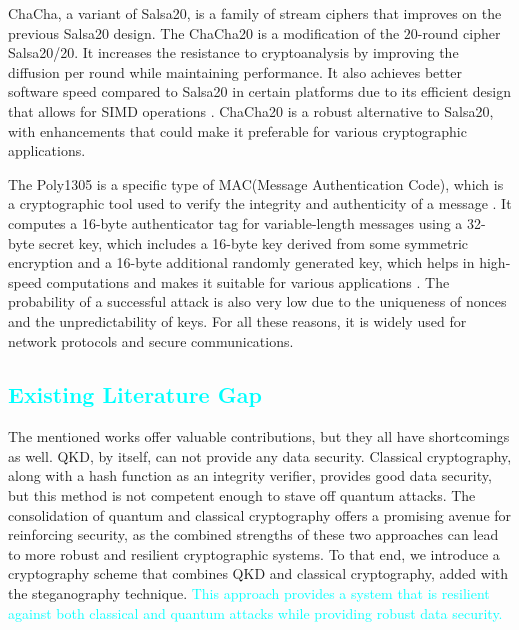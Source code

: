 \documentclass[a4paper]{cas-sc}
\begin{document}
ChaCha, a variant of Salsa20, is a family of stream ciphers that improves on the previous Salsa20 design. The ChaCha20 is a modification of the $20$-round cipher Salsa20/20. It increases the resistance to cryptoanalysis by improving the diffusion per round while maintaining performance. It also achieves better software speed compared to Salsa20 in certain platforms due to its efficient design that allows for SIMD operations \cite{bernstein2008chacha}. ChaCha20 is a robust alternative to Salsa20, with enhancements that could make it preferable for various cryptographic applications.

The Poly1305 is a specific type of MAC(Message Authentication Code), which is a cryptographic tool used to verify the integrity and authenticity of a message \cite{bernstein2005poly1305}. It computes a 16-byte authenticator tag for variable-length messages using a 32-byte secret key, which includes a 16-byte key derived from some symmetric encryption and a 16-byte additional randomly generated key, which helps in high-speed computations and makes it suitable for various applications \cite{bernstein2005poly1305}. The probability of a successful attack is also very low due to the uniqueness of nonces and the unpredictability of keys. For all these reasons, it is widely used for network protocols and secure communications.
\subsection{\textcolor{cyan}{Existing Literature Gap}}
The mentioned works offer valuable contributions, but they all have shortcomings as well. QKD, by itself, can not
provide any data security. Classical cryptography, along with a hash function as an integrity verifier, provides good data security, but this method is not competent enough to stave off quantum attacks. The consolidation of quantum and classical cryptography offers a promising avenue for reinforcing security, as the combined strengths of these two approaches can lead to more robust and resilient cryptographic systems. To that end, we introduce a cryptography scheme that combines QKD and classical cryptography, added with the steganography technique. \textcolor{cyan}{This approach provides a system that is resilient against both classical and quantum attacks while providing robust data security.}
\end{document}
